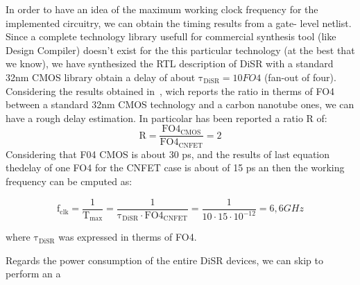 In order to have an idea of the maximum working clock frequency for the
implemented circuitry, we can obtain the timing results from a gate-
level netlist. Since a complete technology library usefull for 
commercial synthesis tool (like Design Compiler) doesn't exist for the this particular technology
(at the best that we know), we have synthesized the RTL description of DiSR
with a standard 32nm CMOS library obtain 
a delay of about $\mathrm{\tau_{DiSR}=10} FO4$ (fan-out of four).
Considering the results obtained in~\cite{deng_isscc07}, wich reports the
ratio in therms of FO4 between a standard 32nm CMOS technology and a
carbon nanotube ones, we can have a rough delay estimation.
In particolar has been reported a ratio R of: 
\begin{equation}
\mathrm{R=\frac{FO4_{CMOS}}{FO4_{CNFET}}=2} 
\end{equation}
Considering that F04 CMOS is about 30 ps, and the results of  
last equation thedelay of one FO4 for the CNFET case is about of
15 ps an then the working frequency can be cmputed as:

\begin{equation}
\mathrm{f_{clk}=\frac{1}{T_{max}}=\frac{1}{\tau_{DiSR} \cdot FO4_{CNFET}}}=
\frac{1}{10\cdot 15 \cdot 10^{-12}}=6,6 GHz
\end{equation}

where $\mathrm{\tau_{DiSR}}$ was expressed in therms of FO4.

Regards the power
consumption of the entire DiSR devices, we can skip to perform an a





